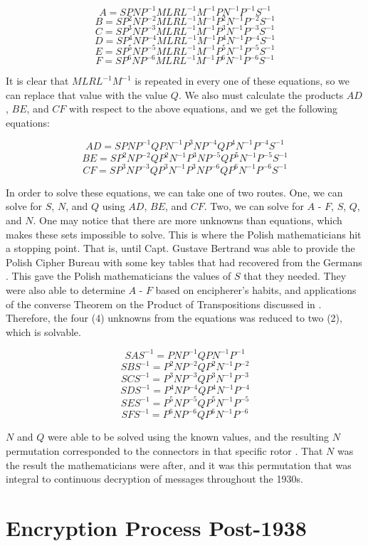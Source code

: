 $$A = SPNP^{-1}MLRL^{-1}M^{-1}PN^{-1}P^{-1}S^{-1}$$
$$B = SP^2NP^{-2}MLRL^{-1}M^{-1}P^2N^{-1}P^{-2}S^{-1}$$
$$C = SP^3NP^{-3}MLRL^{-1}M^{-1}P^3N^{-1}P^{-3}S^{-1}$$
$$D = SP^4NP^{-4}MLRL^{-1}M^{-1}P^4N^{-1}P^{-4}S^{-1}$$
$$E = SP^5NP^{-5}MLRL^{-1}M^{-1}P^5N^{-1}P^{-5}S^{-1}$$
$$F = SP^6NP^{-6}MLRL^{-1}M^{-1}P^6N^{-1}P^{-6}S^{-1}$$

It is clear that $MLRL^{-1}M^{-1}$ is repeated in every one of these equations, so we can replace that value with the value $Q$. \cite{wk85} We also must calculate the products $AD$, $BE$, and $CF$ with respect to the above equations, and we get the following equations:

$$AD = SPNP^{-1}QPN^{-1}P^3NP^{-4}QP^4N^{-1}P^{-4}S^{-1}$$
$$BE = SP^2NP^{-2}QP^2N^{-1}P^3NP^{-5}QP^5N^{-1}P^{-5}S^{-1}$$
$$CF = SP^3NP^{-3}QP^3N^{-1}P^3NP^{-6}QP^6N^{-1}P^{-6}S^{-1}$$

In order to solve these equations, we can take one of two routes. One, we can solve for $S$, $N$, and $Q$ using $AD$, $BE$, and $CF$. Two, we can solve for $A$ - $F$, $S$, $Q$, and $N$. One may notice that there are more unknowns than equations, which makes these sets impossible to solve. This is where the Polish mathematicians hit a stopping point. That is, until Capt. Gustave Bertrand was able to provide the Polish Cipher Bureau with some key tables that had recovered from the Germans \cite{wk85}. This gave the Polish mathematicians the values of $S$ that they needed. They were also able to determine $A$ - $F$ based on encipherer's habits, and applications of the converse Theorem on the Product of Transpositions discussed in . Therefore, the four (4) unknowns from the equations was reduced to two (2), which is solvable.

$$SAS^{-1} = PNP^{-1}QPN^{-1}P^{-1}$$
$$SBS^{-1} = P^2NP^{-2}QP^2N^{-1}P^{-2}$$
$$SCS^{-1} = P^3NP^{-3}QP^3N^{-1}P^{-3}$$
$$SDS^{-1} = P^4NP^{-4}QP^4N^{-1}P^{-4}$$
$$SES^{-1} = P^5NP^{-5}QP^5N^{-1}P^{-5}$$
$$SFS^{-1} = P^6NP^{-6}QP^6N^{-1}P^{-6}$$

$N$ and $Q$ were able to be solved using the known values, and the resulting $N$ permutation corresponded to the connectors in that specific rotor \cite{wk85}. That $N$ was the result the mathematicians were after, and it was this permutation that was integral to continuous decryption of messages throughout the 1930s.

\section{Encryption Process Post-1938}

